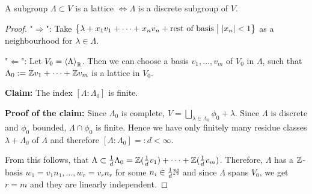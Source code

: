 \begin{Prop}
	A subgroup $\Lambda \subset V$ is a lattice $\Leftrightarrow \Lambda$ is a discrete subgroup of $V$.
\end{Prop}
\begin{proof}
	"$\Rightarrow$": Take $\left\{ {\lambda + x_1v_1 + \dots + x_nv_n + \text{rest of basis} } \bigm| {|x_n| < 1} \right\}$ as a neighbourhood for $\lambda \in \Lambda$.
	
	"$\Leftarrow$": Let $V_0 = \left< \Lambda \right>_{\mathbb{R}}$. Then we can choose a basis $v_1, \dots, v_m$ of $V_0$ in $\Lambda$, such that $\Lambda_0 := \mathbb{Z} v_1 + \dots + \mathbb{Z} v_m$ is a lattice in $V_0$.
	
	\bigskip
	
	\textbf{Claim:} The index $\left[ \Lambda : \Lambda_0 \right]$ is finite.
	
	\textbf{Proof of the claim:} Since $\Lambda_0$ is complete, $V = \bigsqcup_{\lambda \in \Lambda_0} \phi_0 + \lambda$. Since $\Lambda$ is discrete and $\phi_0$ bounded, $\Lambda \cap \phi_0$ is finite. Hence we have only finitely many residue classes $\lambda + \Lambda_0$ of $\Lambda$ and therefore $\left[ \Lambda : \Lambda_0 \right] =: d < \infty$.
	
	\bigskip
	
	From this follows, that $\Lambda \subset \frac{1}{d}\Lambda_0 = \mathbb{Z} (\frac{1}{d} v_1) + \dots + \mathbb{Z} (\frac{1}{d} v_m)$. Therefore, $\Lambda$ has a $\mathbb{Z}$-basis $w_1 = v_1n_1, \dots, w_r = v_rn_r$ for some $n_i \in \frac{1}{d} \mathbb{N}$ and since $\Lambda$ spans $V_0$, we get $r = m$ and they are linearly independent.
\end{proof}







